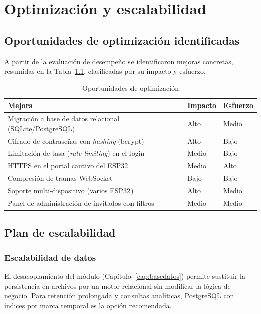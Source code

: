\chapter{Optimización y escalabilidad}
\label{cap:escalabilidad}

\section{Oportunidades de optimización identificadas}
A partir de la evaluación de desempeño se identificaron mejoras concretas, resumidas en la Tabla~\ref{tab:mejoras}, clasificadas por su impacto y esfuerzo.

\begin{table}[H]
\centering
\caption{Oportunidades de optimización}
\label{tab:mejoras}
\footnotesize
\begin{tabularx}{\linewidth}{@{}X l l@{}}
\toprule
\textbf{Mejora} & \textbf{Impacto} & \textbf{Esfuerzo} \\
\midrule
Migración a base de datos relacional (SQLite/PostgreSQL) & Alto & Medio \\
Cifrado de contraseñas con \emph{hashing} (bcrypt) & Alto & Bajo \\
Limitación de tasa (\emph{rate limiting}) en el login & Medio & Bajo \\
HTTPS en el portal cautivo del ESP32 & Medio & Alto \\
Compresión de tramas WebSocket & Bajo & Bajo \\
Soporte multi-dispositivo (varios ESP32) & Alto & Medio \\
Panel de administración de invitados con filtros & Medio & Medio \\
\bottomrule
\end{tabularx}
\end{table}

\section{Plan de escalabilidad}
\subsection{Escalabilidad de datos}
El desacoplamiento del módulo  (Capítulo~\ref{cap:basedatos}) permite sustituir la persistencia en archivos por un motor relacional sin modificar la lógica de negocio. Para retención prolongada y consultas analíticas, PostgreSQL con índices por marca temporal es la opción recomendada.

